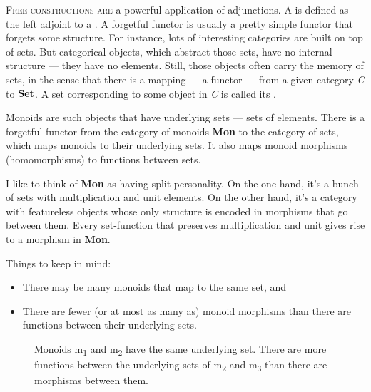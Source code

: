 \lettrine[lhang=0.17]{F}{ree constructions are} a powerful application of adjunctions. A
 is defined as the left adjoint to a . A forgetful functor is usually a pretty simple functor that
forgets some structure. For instance, lots of interesting categories are
built on top of sets. But categorical objects, which abstract those
sets, have no internal structure --- they have no elements. Still, those
objects often carry the memory of sets, in the sense that there is a
mapping --- a functor --- from a given category \emph{C} to
$\mathbf{Set}$. A set corresponding to some object in \emph{C} is called
its .

Monoids are such objects that have underlying sets --- sets of elements.
There is a forgetful functor  from the category of monoids
\textbf{Mon} to the category of sets, which maps monoids to their
underlying sets. It also maps monoid morphisms (homomorphisms) to
functions between sets.

I like to think of \textbf{Mon} as having split personality. On the one
hand, it's a bunch of sets with multiplication and unit elements. On the
other hand, it's a category with featureless objects whose only
structure is encoded in morphisms that go between them. Every
set-function that preserves multiplication and unit gives rise to a
morphism in \textbf{Mon}.

Things to keep in mind:

\begin{itemize}
\tightlist
\item
  There may be many monoids that map to the same set, and
\item
  There are fewer (or at most as many as) monoid morphisms than there
  are functions between their underlying sets.
\end{itemize}

\begin{figure}[H]
\centering
{}
\caption{Monoids m\textsubscript{1} and m\textsubscript{2} have the same
underlying set. There are more functions between the underlying sets of
m\textsubscript{2} and m\textsubscript{3} than there are morphisms
between them.}
\end{figure}

